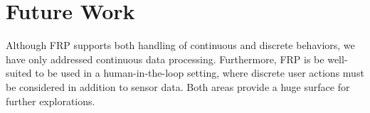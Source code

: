 \section{Future Work}

Although FRP supports both handling of continuous and discrete behaviors, we have only addressed continuous data processing.
Furthermore, FRP is be well-suited to be used in a human-in-the-loop setting, where discrete user actions must be considered in addition to sensor data. Both areas provide a huge surface for further explorations.

